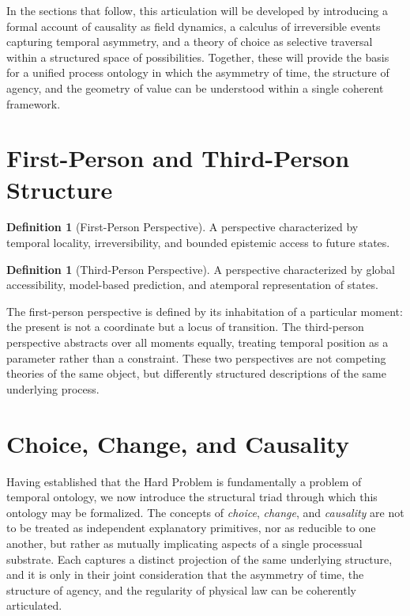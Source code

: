 \documentclass[11pt,a4paper]{article}
\theoremstyle{definition}
\newtheorem{definition}[theorem]{Definition}
\theoremstyle{remark}
\begin{document}
In the sections that follow, this articulation will be developed by introducing a formal account of causality as field dynamics, a calculus of irreversible events capturing temporal asymmetry, and a theory of choice as selective traversal within a structured space of possibilities. Together, these will provide the basis for a unified process ontology in which the asymmetry of time, the structure of agency, and the geometry of value can be understood within a single coherent framework.

\section{First-Person and Third-Person Structure}

\begin{definition}[First-Person Perspective]
A perspective characterized by temporal locality, irreversibility, and bounded epistemic access to future states.
\end{definition}

\begin{definition}[Third-Person Perspective]
A perspective characterized by global accessibility, model-based prediction, and atemporal representation of states.
\end{definition}

The first-person perspective is defined by its inhabitation of a particular moment: the present is not a coordinate but a locus of transition. The third-person perspective abstracts over all moments equally, treating temporal position as a parameter rather than a constraint. These two perspectives are not competing theories of the same object, but differently structured descriptions of the same underlying process.

\section{Choice, Change, and Causality}

Having established that the Hard Problem is fundamentally a problem of temporal ontology, we now introduce the structural triad through which this ontology may be formalized. The concepts of \emph{choice}, \emph{change}, and \emph{causality} are not to be treated as independent explanatory primitives, nor as reducible to one another, but rather as mutually implicating aspects of a single processual substrate. Each captures a distinct projection of the same underlying structure, and it is only in their joint consideration that the asymmetry of time, the structure of agency, and the regularity of physical law can be coherently articulated.
\end{document}
